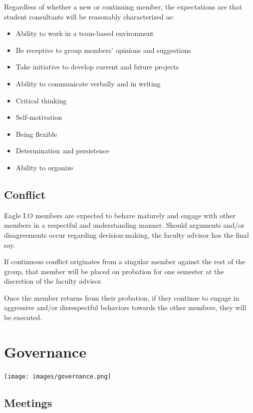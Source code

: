 \documentclass[
]{book}
\providecommand{\tightlist}{%
  \setlength{\itemsep}{0pt}\setlength{\parskip}{0pt}}
\begin{document}
Regardless of whether a new or continuing member, the expectations are that student consultants will be reasonably characterized as:

\begin{itemize}
\tightlist
\item
  Ability to work in a team-based environment
\item
  Be receptive to group members' opinions and suggestions
\item
  Take initiative to develop current and future projects
\item
  Ability to communicate verbally and in writing
\item
  Critical thinking
\item
  Self-motivation
\item
  Being flexible
\item
  Determination and persistence
\item
  Ability to organize
\end{itemize}

\hypertarget{conflict}{%
\section{Conflict}\label{conflict}}

Eagle I.O members are expected to behave maturely and engage with other members in a respectful and understanding manner. Should arguments and/or disagreements occur regarding decision-making, the faculty advisor has the final say.

If continuous conflict originates from a singular member against the rest of the group, that member will be placed on probation for one semester at the discretion of the faculty advisor.

Once the member returns from their probation, if they continue to engage in aggressive and/or disrespectful behaviors towards the other members, they will be executed.

\hypertarget{governance}{%
\chapter{Governance}\label{governance}}

\texttt{[image: images/governance.png]}

\hypertarget{meetings}{%
\section{Meetings}\label{meetings}}
\end{document}
